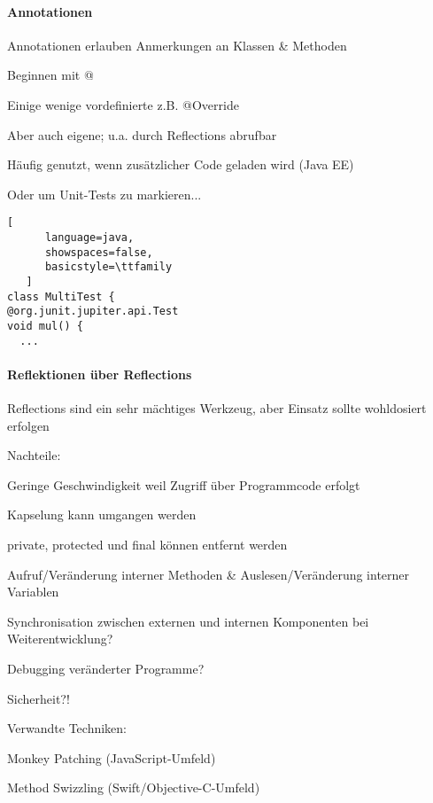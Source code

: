 \documentclass[10pt]{article}
\begin{document}
\paragraph{Annotationen}
\begin{itemize*}
  \item Annotationen erlauben Anmerkungen an Klassen \& Methoden
  \item Beginnen mit @
  \item Einige wenige vordefinierte z.B. @Override
  \item Aber auch eigene; u.a. durch Reflections abrufbar
  \item Häufig genutzt, wenn zusätzlicher Code geladen wird (Java EE)
  \item Oder um Unit-Tests zu markieren...
\end{itemize*}

\begin{lstlisting}[
      language=java,
      showspaces=false,
      basicstyle=\ttfamily
   ]
class MultiTest {
@org.junit.jupiter.api.Test
void mul() {
  ...
\end{lstlisting}


\paragraph{Reflektionen über Reflections}
\begin{itemize*}
  \item Reflections sind ein sehr mächtiges Werkzeug, aber Einsatz sollte wohldosiert erfolgen
  \item Nachteile:
  \begin{itemize*}
    \item Geringe Geschwindigkeit weil Zugriff über Programmcode erfolgt
    \item Kapselung kann umgangen werden
    \begin{itemize*}
      \item private, protected und final können entfernt werden
      \item Aufruf/Veränderung interner Methoden \& Auslesen/Veränderung interner Variablen
      \item Synchronisation zwischen externen und internen Komponenten bei Weiterentwicklung?
    \end{itemize*}
    \item Debugging veränderter Programme?
    \item Sicherheit?!
  \end{itemize*}
  \item Verwandte Techniken:
  \begin{itemize*}
    \item Monkey Patching (JavaScript-Umfeld)
    \item Method Swizzling (Swift/Objective-C-Umfeld)
  \end{itemize*}
\end{itemize*}
\end{document}
